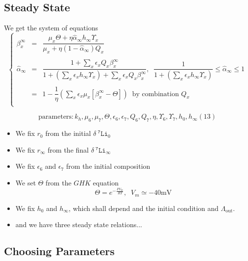 \documentclass[aps,onecolumn,10pt]{revtex4}
\newcommand{\mychem}[1]{\mathtt{#1}}
\newcommand{\spLi}[1]{{~^{\mychem{#1}}\mychem{Li}}}
\newcommand{\deltaLi}{ {\delta\!\!\!\spLi{7}} }
\newcommand{\LiAll}{\Lambda}
\newcommand{\LiAllOut}{{\LiAll}_{\mathrm{out}}}
\begin{document}
\subsection{Steady State}
We get the system of equations
\begin{equation}
\label{eq:steady}
\left\lbrace
\begin{array}{rcl}
	\beta_x^\infty & = & \dfrac{\mu_x\Theta + \eta \hat\alpha_\infty h_\infty \Upsilon_x}{\mu_x + \eta (1-\hat\alpha_\infty) Q_x}\\\
	\\
	\hat\alpha_\infty & = & \dfrac{1+\sum_x\epsilon_x Q_x\beta_x^\infty
	}{1 + \left(\sum_x \epsilon_x h_\infty \Upsilon_x \right) + \sum_x\epsilon_x Q_x\beta_x^\infty
	}, \;\; \dfrac{1}{1+\left(\sum_x \epsilon_x h_\infty \Upsilon_x \right)}\leq\hat\alpha_\infty \leq 1\\\
	\\
	& = & 1 - \dfrac{1}{\eta}\left( \sum_x \epsilon_x \mu_x \left[\beta_x^\infty - \Theta\right]\right) \;\; \text{by combination } Q_x\\
\end{array}
\right.
\end{equation}

\begin{equation}
\text{parameters} : k_h, \mu_6, \mu_7, \Theta, \epsilon_6, \epsilon_7, Q_6, Q_7, \eta, \Upsilon_6, \Upsilon_7, h_0, h_\infty (13)
\end{equation}

\begin{itemize}
	\item We fix $r_0$ from the initial $\deltaLi_0$
	\item We fix $r_\infty$ from the final $\deltaLi_\infty$
	\item We fix $\epsilon_6$ and $\epsilon_7$ from the initial composition
	\item We set $\Theta$ from the $GHK$ equation
	$$
		\Theta = e^{ -\frac{FV_m}{RT} },\;\;V_m\simeq -40\text{mV}
	$$
	\item We fix $h_0$ and $h_\infty$, which shall depend and the initial condition and $\LiAllOut$.
	\item and we have three steady state relations...
\end{itemize}

\subsection{Choosing Parameters}
\end{document}
